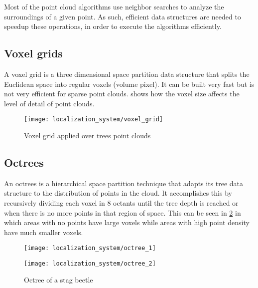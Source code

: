Most of the point cloud algorithms use neighbor searches to analyze the surroundings of a given point. As such, efficient data structures are needed to speedup these operations, in order to execute the algorithms efficiently.


\subsection{Voxel grids}

A voxel grid is a three dimensional space partition data structure that splits the Euclidean space into regular voxels (volume pixel). It can be built very fast but is not very efficient for sparse point clouds.  shows how the voxel size affects the level of detail of point clouds.

\begin{figure}[H]
	\centering
	\texttt{[image: localization\_system/voxel\_grid]}
	\caption[Voxel grid applied over trees point clouds]{Voxel grid applied over trees point clouds \cite{Wu2013}}
	\label{fig:point-cloud-algorithms_voxel-grid}
\end{figure}



\subsection{Octrees}

An octrees is a hierarchical space partition technique that adapts its tree data structure to the distribution of points in the cloud. It accomplishes this by recursively dividing each voxel in 8 octants until the tree depth is reached or when there is no more points in that region of space. This can be seen in \cref{fig:point-cloud-algorithms_octree} in which areas with no points have large voxels while areas with high point density have much smaller voxels.

\begin{figure}[H]
	\centering
	\begin{minipage}[h]{.495\textwidth}
		\centering
		\texttt{[image: localization\_system/octree\_1]}
	\end{minipage}\hfill
	\begin{minipage}[h]{.495\textwidth}
		\centering
		\texttt{[image: localization\_system/octree\_2]}
	\end{minipage}
	\caption[Octree of a stag beetle]{Octree of a stag beetle\protect\footnotemark}
	\label{fig:point-cloud-algorithms_octree}
\end{figure}



